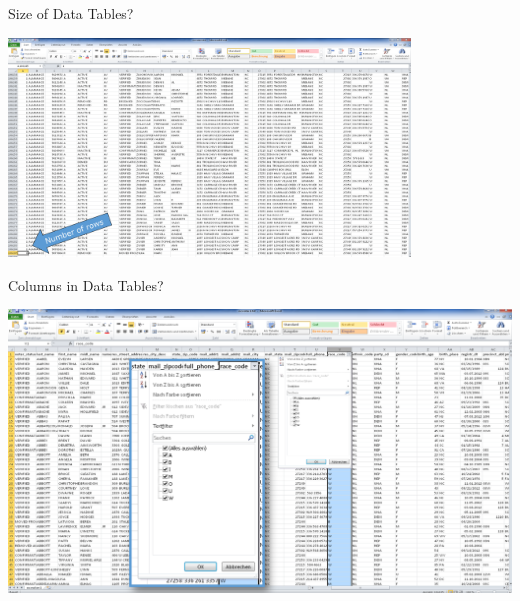 \documentclass[aspectratio=169]{../latex_main/tntbeamer}  %
\begin{document}
\begin{frame}[c]{Size of Data Tables?}

\includegraphics[width=0.8\textwidth]{bild7_rows}

\end{frame}


\begin{frame}[c]{Columns in Data Tables?}

\includegraphics[width=1.0\textwidth]{bild8_race_code}

\end{frame}
\end{document}
